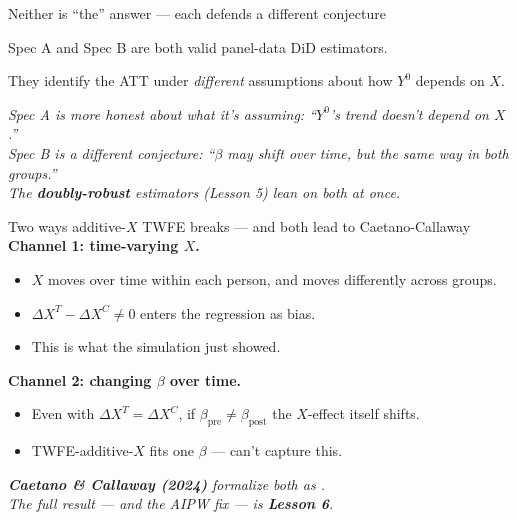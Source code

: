 \documentclass[aspectratio=169,11pt]{beamer}
\begin{document}
\begin{frame}{Neither is ``the'' answer --- each defends a different conjecture}
\vspace{0.8em}
\begin{center}
\large
Spec A and Spec B are both valid panel-data DiD estimators.
\end{center}
\vspace{0.6em}
\begin{center}
They identify the ATT under \textit{different} assumptions about how $Y^0$ depends on $X$.
\end{center}
\vspace{1em}
\begin{center}
\small\color{warmgray}\itshape
Spec A is more honest about \textit{what} it's assuming: ``$Y^0$'s trend doesn't depend on $X$.'' \\[0.2em]
Spec B is a different conjecture: ``$\beta$ may shift over time, but the same way in both groups.'' \\[0.4em]
The \textbf{doubly-robust} estimators (Lesson 5) lean on both at once.
\end{center}
\end{frame}

\begin{frame}{Two ways additive-$X$ TWFE breaks --- and both lead to Caetano-Callaway}
\vspace{0.4em}
\textbf{Channel 1: time-varying $X$.}
\begin{itemize}\small
  \item $X$ moves over time within each person, and moves differently across groups.
  \item $\Delta X^T - \Delta X^C \neq 0$ enters the regression as bias.
  \item This is what the simulation just showed.
\end{itemize}
\vspace{0.4em}
\textbf{Channel 2: changing $\beta$ over time.}
\begin{itemize}\small
  \item Even with $\Delta X^T = \Delta X^C$, if $\beta_{\text{pre}} \neq \beta_{\text{post}}$ the $X$-effect itself shifts.
  \item TWFE-additive-$X$ fits one $\beta$ --- can't capture this.
\end{itemize}
\vspace{0.6em}
\begin{center}
\small\color{warmgray}\itshape
\textbf{Caetano \& Callaway (2024)} formalize both as . \\[0.1em]
The full result --- and the AIPW fix --- is \textbf{Lesson 6}.
\end{center}
\end{frame}
\end{document}
